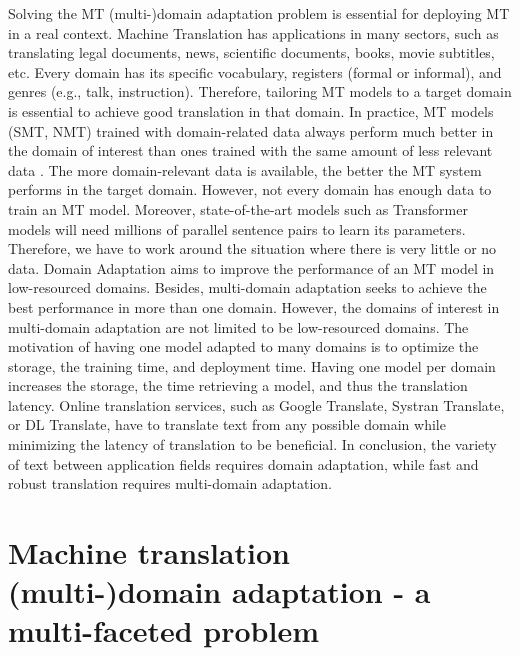 Solving the MT (multi-)domain adaptation problem is essential for deploying MT in a real context. Machine Translation has applications in many sectors, such as translating legal documents, news, scientific documents, books, movie subtitles, etc. Every domain has its specific vocabulary, registers (formal or informal), and genres (e.g., talk, instruction). Therefore, tailoring MT models to a target domain is essential to achieve good translation in that domain. In practice, MT models (SMT, NMT) trained with domain-related data always perform much better in the domain of interest than ones trained with the same amount of less relevant data \citep{Rico13domain, Saunders21Domain}. The more domain-relevant data is available, the better the MT system performs in the target domain. However, not every domain has enough data to train an MT model. Moreover, state-of-the-art models such as Transformer models will need millions of parallel sentence pairs to learn its parameters. Therefore, we have to work around the situation where there is very little or no data. Domain Adaptation aims to improve the performance of an MT model in low-resourced domains. Besides, multi-domain adaptation seeks to achieve the best performance in more than one domain. However, the domains of interest in multi-domain adaptation are not limited to be low-resourced domains. The motivation of having one model adapted to many domains is to optimize the storage, the training time, and deployment time. Having one model per domain increases the storage, the time retrieving a model, and thus the translation latency. Online translation services, such as Google Translate, Systran Translate, or DL Translate, have to translate text from any possible domain while minimizing the latency of translation to be beneficial. In conclusion, the variety of text between application fields requires domain adaptation, while fast and robust translation requires multi-domain adaptation.

\section{Machine translation (multi-)domain adaptation - a multi-faceted problem}
\label{sec:multi-facet}
